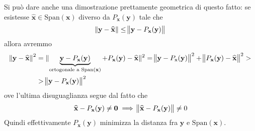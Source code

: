 \begin{remark}
Si può dare anche una dimostrazione prettamente geometrica di questo fatto: se esistesse $\widehat{\mathbf{x}}\in \mathrm{Span}(\mathbf{x})$ diverso da $P_{\mathbf{x}}(\mathbf{y})$ tale che
\[
\norm{\mathbf{y}-\widehat{\mathbf{x}}} \le \norm{\mathbf{y}-P_{\mathbf{x}}(\mathbf{y})}
\]
allora avremmo 
\[
\begin{split}
    \norm{\mathbf{y}-\widehat{\mathbf{x}}}^2 & = \lVert{\underbrace{\mathbf{y}-P_{\mathbf{x}}(\mathbf{y})}_{\text{ortogonale a $\mathrm{Span}(\mathbf{x})$}}+P_{\mathbf{x}}(\mathbf{y}) - \widehat{\mathbf{x}}}\rVert^2 = \norm{\mathbf{y}-P_{\mathrm{x}}(\mathbf{y})}^2 + \norm{P_{\mathbf{x}}(\mathbf{y})-\widehat{\mathbf{x}}}^2 > \\
    & > \norm{\mathbf{y}-P_{\mathbf{x}}(\mathbf{y})} ^2
\end{split}
\]
ove l'ultima disuguaglianza segue dal fatto che
\[
\widehat{\mathbf{x}}-P_{\mathbf{x}}(\mathbf{y})\ne \mathbf{0} \implies \norm{\widehat{\mathbf{x}}-P_{\mathbf{x}}(\mathbf{y})}\ne 0
\]
Quindi effettivamente $P_{\mathbf{x}}(\mathbf{y})$ minimizza la distanza fra $\mathbf{y}$ e $\mathrm{Span}(\mathbf{x})$.
\end{remark}
